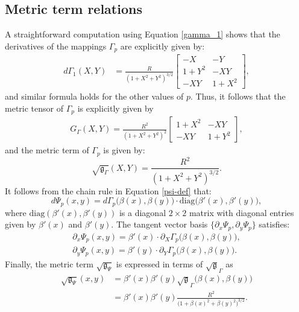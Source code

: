 \documentclass[preprint,12pt]{elsarticle}
\begin{document}
\begin{linenumbers}
\section{Metric term relations}
\label{metric_terms}
A straightforward computation using Equation \eqref{gamma_1} shows that the derivatives of the mappings $\Gamma_p$ are explicitly given by:
\begin{align}
	\label{dgamma_1}
	d{\Gamma}_{1}(X,Y) &= \frac{R}{{(1 + X^2 + Y^2)}^{3/2}}
	\begin{bmatrix}
		-X & -Y \\
		1+Y^2  & -XY \\
		-XY  & 1+X^2
	\end{bmatrix},
\end{align}
and similar formula holds for the other values of $p$.
Thus, it follows that the metric tensor of $\Gamma_p$ is explicitly given by
\begin{align}
	\label{gamma_tensor_explicity}
	G_{{\Gamma}}(X,Y) = 
	\frac{R^2}{(1 + X^2 + Y^2)^2}
	\begin{bmatrix}
		1+ X^2 &  -XY \\
		-XY & 1 + Y^2
	\end{bmatrix},
\end{align}
and the metric term of $\Gamma_p$ is given by:
\begin{equation}
	\label{mt_gamma_explicity}
	\sqrt{\mathfrak{g}_{{\Gamma}}}(X,Y) = \frac{R^2}{(1+X^2+Y^2)^{3/2}}.
\end{equation}
It follows from the chain rule in Equation \eqref{psi-def} that:
\begin{equation}
	\label{dpsi}
	d {\Psi}_p(x,y) = d {\Gamma}_p\big(\beta(x),\beta(y)\big)\cdot\text{diag}\big(\beta'(x),\beta'(y)\big),
\end{equation}
where $\text{diag}(\beta'(x),\beta'(y))$ is a diagonal $2\times 2$ matrix with diagonal entries given by $\beta'(x)$ and $\beta'(y)$.
The tangent vector basis $\{{\partial_x  {\Psi}_p},  {\partial_y  {\Psi}_p}\}$ satisfies:
\begin{align}
	\label{dx_psi}
	{\partial_x  {\Psi}_p}(x,y) = \beta'(x) \cdot {\partial_X 
		{\Gamma}_p}\big(\beta(x),\beta(y)\big),\\
	\label{dy_psi}
	{\partial_y  {\Psi}_p}(x,y) = \beta'(y) \cdot {\partial_Y  {\Gamma}_p}\big(\beta(x),\beta(y)\big).
\end{align}
Finally, the metric term $\sqrt{\mathfrak{g}_{\Psi}}$ is expressed in terms of $\sqrt{\mathfrak{g}}_{\Gamma}$ as
\begin{align}
	\sqrt{\mathfrak{g}_{\Psi}}(x,y) &= \beta'(x)\beta'(y)\sqrt{\mathfrak{g}}_{\Gamma}\big(\beta(x),\beta(y)\big)\\
	&= \beta'(x)\beta'(y)\frac{R^2}{\big(1+\beta(x)^2+\beta(y)^2\big)^{3/2}}.
\end{align}


\end{linenumbers}
\end{document}

